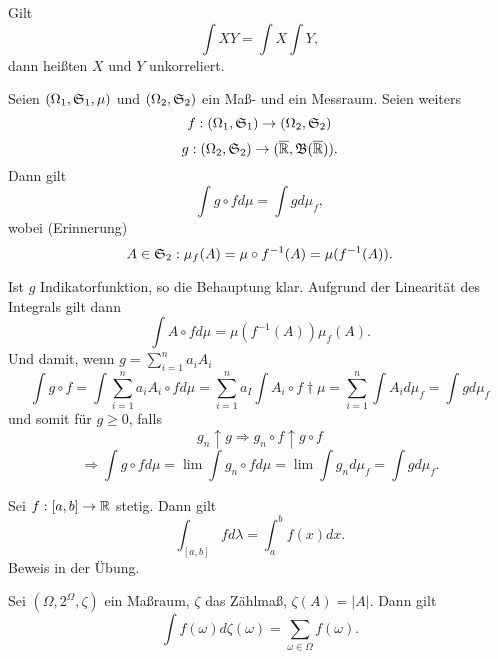 			\begin{defi}
				Gilt
				\[ \int XY=\int X\int Y, \]
				dann heißten $X$ und $Y$ unkorreliert. 
			\end{defi}
			
			\begin{satz}
				Seien $(\Omega_1,\mathfrak{S}_1,\mu)$ und $(\Omega_2,\mathfrak{S}_2)$ ein Maß- und ein Messraum. Seien weiters 
				\[ f: (\Omega_1,\mathfrak{S}_1)\to(\Omega_2,\mathfrak{S}_2) \]
				\[ g: (\Omega_2,\mathfrak{S}_2)\to(\overline{\mathbb{R}},\mathfrak{B}(\overline{\mathbb{R}})). \]
				Dann gilt
				\[ \int g\circ f d\mu=\int gd\mu_f, \]
				wobei (Erinnerung)
				\[ A\in\mathfrak{S}_2: \mu_f(A)=\mu\circ f^{-1}(A)=\mu(f^{-1}(A)). \]
			\end{satz}
			
			\begin{defi}
				Ist $g$ Indikatorfunktion, so die Behauptung klar. Aufgrund der Linearität des Integrals gilt dann
				\[ \int A\circ f d\mu=\mu(f^{-1}(A))\mu_f(A).  \]
				Und damit, wenn $g=\sum_{i=1}^{n}a_i A_i$
				\[ \int g\circ f=\int \sum_{i=1}^n a_i A_i\circ f d\mu=\sum_{i=1}^na_I\int A_i\circ f\dagger\mu=\sum_{i=1}^{n}\int A_id\mu_f=\int g d\mu_f \]
				und somit für $g\ge 0$, falls
				\[ g_n\uparrow g\Rightarrow g_n\circ f\uparrow g\circ f \]
				\[ \Rightarrow \int g\circ fd\mu=\lim \int g_n\circ fd\mu=\lim\int g_nd\mu_f=\int gd\mu_f. \]
			\end{defi}
			
			\begin{bsp}
				Sei $f: [a,b]\to\mathbb{R}$ stetig. Dann gilt
				\[ \int_{[a,b]} fd\lambda=\int_a^b f(x)dx. \]
				Beweis in der Übung. 
			\end{bsp}
			
			\begin{bsp}
				Sei $(\Omega,2^\Omega,\zeta)$ ein Maßraum, $\zeta$ das Zählmaß, $\zeta(A)=|A|$. Dann gilt
				\[ \int f(\omega)d\zeta(\omega)=\sum_{\omega\in\Omega} f(\omega). \]
			\end{bsp}
			
